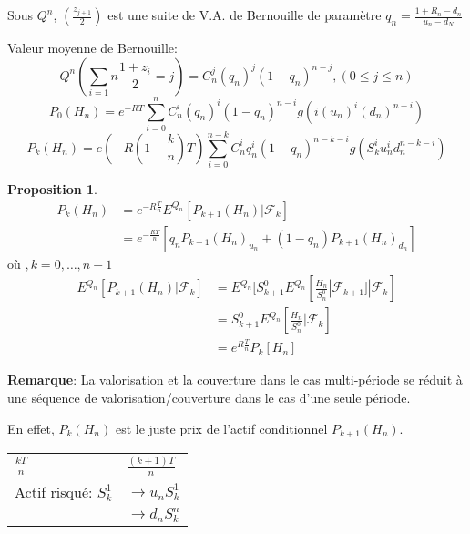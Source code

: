 \documentclass{article}
\theoremstyle{plain}
\theoremstyle{definition}
\newtheorem{propos}[thm]{Proposition}
\begin{document}
Sous $Q^n$, $(\frac{z_{j+1}}{2})$ est une suite de V.A. de Bernouille de param\`etre $q_n=\frac{1+R_n-d_n}{u_n-d_N}$

Valeur moyenne de Bernouille:
\begin{equation}
Q^n(\sum_{i=1}{n}\frac{1+z_i}{2}=j)=C_n^j(q_n)^j(1-q_n)^{n-j},(0\leq j\leq n)
\end{equation}
\begin{equation}
P_0(H_n)=e^{-RT}\sum_{i=0}^n C_n^i(q_n)^i(1-q_n)^{n-i}g(i(u_n)^i(d_n)^{n-i})
\end{equation}
\begin{equation}
P_k(H_n)=e(-R(1-\frac{k}{n})T)\sum_{i=0}^{n-k}C_n^iq_n^i(1-q_n)^{n-k-i}g(S_k^iu_n^id_n^{n-k-i})
\end{equation}

\begin{propos}
	\begin{equation}
\begin{split}
P_k(H_n)&=e^{-R\frac{T}{n}}E^{Q_n}[P_{k+1}(H_n)|\mathcal{F}_k]\\
&=e^{-\frac{RT}{n}}[q_nP_{k+1}(H_n)_{u_n}+(1-q_n)P_{k+1}(H_n)_{d_n}]
\end{split}
\end{equation}
o\`u $,k=0,\ldots,n-1$
\begin{equation}
\begin{split}
E^{Q_n}[P_{k+1}(H_n)|\mathcal{F}_k]&=E^{Q_n}[S_{k+1}^0E^{Q_n}[\frac{H_n}{S_n^0}|\mathcal{F}_{k+1}]|\mathcal{F}_k]\\
&=S^0_{k+1}E^{Q_n}[\frac{H_n}{S_n^0}|\mathcal{F}_k]\\
&=e^{R\frac{T}{n}}P_k[H_n]
\end{split}
\end{equation}
\end{propos}


\textbf{Remarque}:
La valorisation et la couverture dans le cas multi-p\'eriode se r\'eduit \`a une s\'equence de valorisation/couverture dans le cas d'une seule p\'eriode.

En effet, $P_k(H_n)$ est le juste prix de l'actif conditionnel $P_{k+1}(H_n)$.
\begin{center}
\begin{tabular}{ll}
 $\frac{kT}{n}$ & $\frac{(k+1)T}{n}$\\
 Actif risqu\'e: $S_k^1$ & $\rightarrow u_nS_k^1$\\
 & $\rightarrow d_nS_k^n$
\end{tabular}
\end{center}
\end{document}

